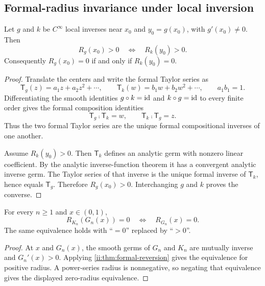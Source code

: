 \subsection{Formal-radius invariance under local inversion}

\begin{theorem}
\label{ii:thm:formal-reversion}
Let $g$ and $k$ be $C^\infty$ local inverses near $x_0$ and $y_0=g(x_0)$, with
$g'(x_0)\ne0$.  Then
\begin{equation}
 R_g(x_0)>0\quad\Longleftrightarrow\quad R_k(y_0)>0.
 \label{ii:eq:radius-invariance}
\end{equation}
Consequently $R_g(x_0)=0$ if and only if $R_k(y_0)=0$.
\end{theorem}

\begin{proof}
Translate the centers and write the formal Taylor series as
\[
 \mathsf T_g(z)=a_1z+a_2z^2+\cdots,
 \qquad
 \mathsf T_k(w)=b_1w+b_2w^2+\cdots,
 \qquad a_1b_1=1.
\]
Differentiating the smooth identities $g\mathbin{\circ} k=\operatorname{id}$ and $k\mathbin{\circ} g=\operatorname{id}$ to every
finite order gives the formal composition identities
\begin{equation}
 \mathsf T_g\comp\mathsf T_k=w,
 \qquad
 \mathsf T_k\comp\mathsf T_g=z.
 \label{ii:eq:formal-inverse-identities}
\end{equation}
Thus the two formal Taylor series are the unique formal compositional inverses
of one another.

Assume $R_k(y_0)>0$.  Then $\mathsf T_k$ defines an analytic germ with nonzero linear
coefficient.  By the analytic inverse-function theorem it has a convergent analytic
inverse germ.  The Taylor series of that inverse is the unique formal inverse of
$\mathsf T_k$, hence equals $\mathsf T_g$.  Therefore $R_g(x_0)>0$.  Interchanging $g$
and $k$ proves the converse.
\end{proof}

\begin{corollary}
\label{ii:cor:radius-transport}
For every $n\geq1$ and $x\in(0,1)$,
\begin{equation}
 R_{K_n}(G_n(x))=0\quad\Longleftrightarrow\quad R_{G_n}(x)=0.
 \label{ii:eq:radius-transport}
\end{equation}
The same equivalence holds with ``$=0$'' replaced by ``$>0$''.
\end{corollary}

\begin{proof}
At $x$ and $G_n(x)$, the smooth germs of $G_n$ and $K_n$ are mutually
inverse and $G_n'(x)>0$.  Applying \cref{ii:thm:formal-reversion} gives the
equivalence for positive radius.  A power-series radius is nonnegative, so
negating that equivalence gives the displayed zero-radius equivalence.
\end{proof}

